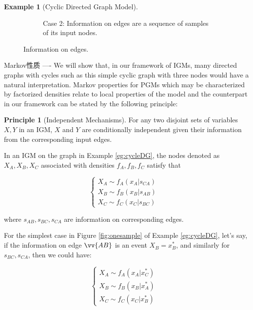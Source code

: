 \documentclass{article}
\theoremstyle{definition}
\theoremstyle{remark}
\theoremstyle{definition}
\newtheorem{example}{Example}[section]
\newtheorem{principle}[theorem]{Principle}
\begin{document}
\begin{CJK*}{UTF8}{gbsn}
\begin{example}[Cyclic Directed Graph Model]
\begin{figure}[h]
\begin{subfigure}[tb]{0.45\textwidth}
		\caption{Case 2: Information on edges are a sequence of samples of its input nodes.}
		\label{fig:manysamples}
	\end{subfigure}\caption{Information on edges.}
\end{figure}

\end{example}

Markov性质 ----
We will show that, in our framework of IGMs, many directed graphs with cycles such as this simple cyclic graph with three nodes would have a natural interpretation. Markov properties for PGMs which may be characterized by factorized densities relate to local properties of the model and the counterpart in our framework can be stated by the following principle:

\begin{principle}[Independent Mechanisms]
    For any two disjoint sets of variables $X, Y$ in  an IGM, $X$ and $Y$ are conditionally independent given their information from the corresponding input edges.
\end{principle}

In an IGM on the graph in Example \ref{eg:cycleDG}, the nodes denoted as $X_A, X_B, X_C$ associated with densities $f_A, f_B, f_C$ satisfy that 

\begin{equation} \label{eq:1}
\left\{
     \begin{array}{lr}
     X_A \sim f_A(x_A|s_{CA}) &  \\
     X_B \sim f_B(x_B|s_{AB}) & \\
     X_C \sim f_C(x_C|s_{BC}) &  
     \end{array}
\right.
\end{equation}

where $s_{AB}, s_{BC}, s_{CA}$ are information on corresponding edges.

For the simplest case in Figure \ref{fig:onesample} of Example \ref{eg:cycleDG}, let's say, if the information on edge $\vv{AB}$ is an event $X_B=x_B^*$, and similarly for $s_{BC}, s_{CA}$, then we could have:

\begin{equation}
\left\{
     \begin{array}{lr}
     X_A \sim f_A(x_A|x_{C}^*) &  \\
     X_B \sim f_B(x_B|x_{A}^*) & \\
     X_C \sim f_C(x_C|x_{B}^*) &  
     \end{array}
\right.
\end{equation}


\end{CJK*}
\end{document}
